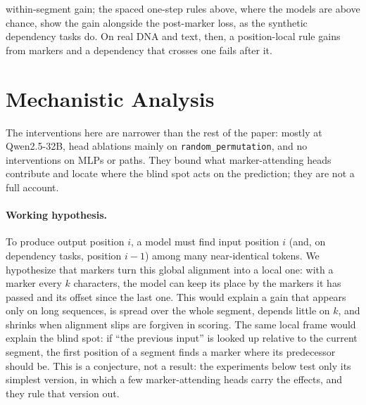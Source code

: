 \documentclass[10pt]{article} %
\newcommand{\task}[1]{\texttt{#1}}
\begin{document}
within-segment gain; the spaced one-step rules above, where the models are above chance, show the gain alongside the post-marker loss, as the synthetic dependency tasks do. On real DNA and text, then, a position-local rule gains from markers and a dependency that crosses one fails after it.

\begin{table}[!htb]
\centering
\small
\caption{Real sequences: windows of human promoter DNA and of WikiText-2 letters, $N \in \{16, 32, 64\}$, 20 trials per cell. No-marker accuracy, pooled marker effect (no-marker mean length-matched, $k = 3$ excluded), and per-position effects at post-marker and within-segment positions against the no-marker run at the same positions ($k \in \{2, 4, 8, 16\}$), one row per format. Each per-position effect is given under index-by-index scoring and under edit-distance alignment, with the share of the within-segment effect that alignment removes; that share is left blank where the index-scored effect is under 0.02 or the ratio leaves $[0, 1]$ and so is not a share. The other four rules are near chance without markers (Appendix Table~\ref{tab:realfull}). Bold: index-scored post-marker changes of 0.25 or more in size.}
\label{tab:real}
\resizebox{\linewidth}{!}{}
\end{table}

\section{Mechanistic Analysis}
\label{sec:mechanism}

The interventions here are narrower than the rest of the paper: mostly at Qwen2.5-32B, head ablations mainly on \task{random\_permutation}, and no interventions on MLPs or paths. They bound what marker-attending heads contribute and locate where the blind spot acts on the prediction; they are not a full account.

\paragraph{Working hypothesis.} To produce output position $i$, a model must find input position $i$ (and, on dependency tasks, position $i - 1$) among many near-identical tokens. We hypothesize that markers turn this global alignment into a local one: with a marker every $k$ characters, the model can keep its place by the markers it has passed and its offset since the last one. This would explain a gain that appears only on long sequences, is spread over the whole segment, depends little on $k$, and shrinks when alignment slips are forgiven in scoring. The same local frame would explain the blind spot: if ``the previous input'' is looked up relative to the current segment, the first position of a segment finds a marker where its predecessor should be. This is a conjecture, not a result: the experiments below test only its simplest version, in which a few marker-attending heads carry the effects, and they rule that version out.
\end{document}
